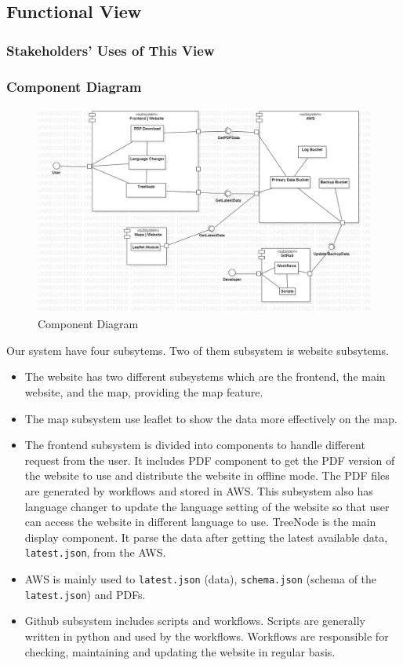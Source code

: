 \subsection{Functional View}

\subsubsection{Stakeholders' Uses of This View}

\subsubsection{Component Diagram}

\begin{figure}[H]
  \centering
  \includegraphics[width=\linewidth]{img/component-diagram.jpg}
  \caption{Component Diagram}
\end{figure}

Our system have four subsytems. Two of them subsystem is website subsytems.
\begin{itemize}
  \item The website has two different subsystems which are the frontend, the main website, and the map, providing the map feature.
  \item The map subsystem use leaflet to show the data more effectively on the map.
  \item The frontend subsystem is divided into components to handle different request from the user.
  \subitem It includes PDF component to get the PDF version of the website to use and distribute the website in offline mode. The PDF files are generated by workflows and stored in AWS.
  \subitem This subsystem also has language changer to update the language setting of the website so that user can access the website in different language to use.
  \subitem TreeNode is the main display component. It parse the data after getting the latest available data, \texttt{latest.json}, from the AWS.
  \item AWS is mainly used to \texttt{latest.json} (data), \texttt{schema.json} (schema of the \texttt{latest.json}) and PDFs.
  \item Github subsystem includes scripts and workflows. Scripts are generally written in python and used by the workflows. Workflows are responsible for checking, maintaining and updating the website in regular basis.
\end{itemize}

